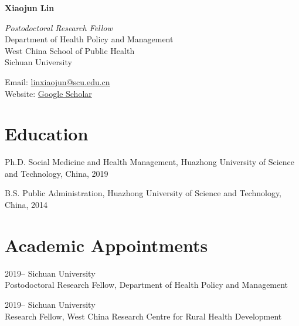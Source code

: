 \documentclass[12pt,letterpaper]{report}
\newcommand{\myname}{Xiaojun Lin}
\newcommand{\namefont}[1]{{\normalfont\bfseries\Huge{#1}}}
\begin{document}
    \raggedright

    \namefont{\myname}

    \vspace{1em}
    \begin{minipage}[t]{0.68\textwidth}
    	\textit{Postodoctoral Research Fellow}  \\
        Department of Health Policy and Management \\
        West China School of Public Health \\
       	Sichuan University
    \end{minipage}
    \begin{minipage}[t]{0.31\textwidth}
        Email: \href{mailto:linxiaojun@scu.edu.cn}{linxiaojun@scu.edu.cn} \\
        Website: \href{https://scholar.google.com/citations?user=ZBGYTowAAAAJ&hl=en}{Google Scholar}
    \end{minipage}
    \vspace{0.5em}


    \section*{Education}

    \begin{tablist}

        \item[Ph.D.] \tab Social Medicine and Health Management, Huazhong University of Science and Technology, China, 2019

        \item[B.S.]  \tab Public Administration,  Huazhong University of Science and Technology, China, 2014


    \end{tablist}



    \section*{Academic Appointments}

    \begin{tablist}

        \item[2019--]   \tab Sichuan University \\
                             		Postodoctoral Research Fellow, Department of Health Policy and Management\\
                       
         \item[2019--]    \tab Sichuan University \\
         							  Research Fellow, West China Research Centre for Rural Health Development         

    \end{tablist}
\end{document}
